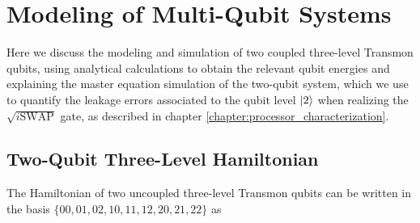 \chapter{Modeling of Multi-Qubit Systems}

Here we discuss the modeling and simulation of two coupled three-level Transmon qubits, using analytical calculations to obtain the relevant qubit energies and explaining the master equation simulation of the two-qubit system, which we use to quantify the leakage errors associated to the qubit level $\left| 2 \right>$ when realizing the $\sqrt{i\mathrm{SWAP}}$ gate, as described in chapter \ref{chapter:processor_characterization}.

\section{Two-Qubit Three-Level Hamiltonian} \label{section:three_level_simulation}

The Hamiltonian of two uncoupled three-level Transmon qubits can be written in the basis $\{00,01,02,10,11,12,20,21,22\}$ as

